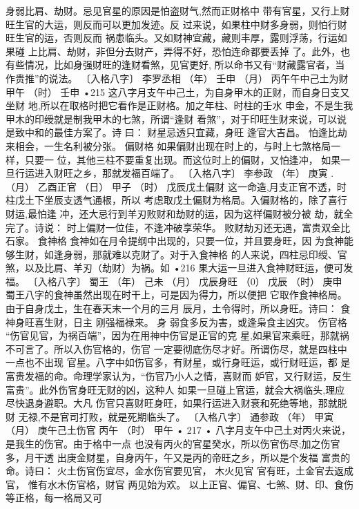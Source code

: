身弱比肩、劫财。忌见官星的原因是怕盗财气,然而正财格中
带有官星，又行上财旺生官的大运，则反而可以更加发迹。反
过来说，如果柱中财多身弱，则怕行财旺生官的运，否则反而
祸患临头。又如财神宜藏，藏则丰厚，露则浮荡，行运如果碰
上比肩、劫财，非但分去财产，弄得不好，恐怕连命都要丢掉
了。此外，也有些情况，比如身强财旺的逢财看煞，见官更好,
所以命书又有“财藏露官者，当作贵推”的说法。
〔入格八字〕 李罗丞相
（年） 壬申
（月） 丙午午中己土为财
甲午
（时） 壬申
•215
这八字月支午中己土，为自身甲木的正财，而自身日支又坐财
地,所以在取格时把它看作是正财格。加之年柱、时柱的壬水
申金，不是生我甲木的印绶就是制我甲木的七煞，所谓“逢财
看煞”，对于印旺生财来说，可以说是致中和的最佳方案了。诗
曰：
财星忌透只宜藏，身旺 逢官大吉昌。
怕逢比劫来相会，一生名利被分张。
偏财格
如果偏财出现在时上的，与时上七煞格局一样，只要一
位，其他三柱不要重复出现。而这位时上的偏财，又怕逢冲，
如果一旦行运进入财旺之乡，那就发福百端了。
〔入格八字〕 李参政
（年） 庚寅 .
（月） 乙酉正官
（日） 甲子
（时） 戊辰戊土偏财
这一命造,月支正官不透，时柱戊土下坐辰支透气通根，所以
考虑取戊土偏财为格局。入偏财格的，除了喜行财运,最怕逢
冲，还大忌行到羊刃败财和劫财的运，因为这样偏财被分被
劫，就全完了。诗说：
时上偏财一位佳，不逢冲破享荣华。
败财劫刃还无遇，富贵双全比石家。
食神格
食神如在月令提纲中出现的，只要一位，并且要身旺，因
为食神能够生财，如逢身弱，那就难以克财了。对于入食神格
的人来说，四柱忌印绶、官煞，以及比肩、羊刃（劫财）为祸。如
•216
果大运一旦进入食神财旺运，便可发福。
〔入格八字〕 蜀王
（年） 己未
（月） 戊辰身旺
（0） 戊辰
（时） 庚申
蜀王八字的食神虽然出现在时干上，可是因为得力，所以便把
它取作食神格局。由于自身戊土，生在春天末一个月的三月
辰月，土令得时，所以身旺。诗曰：
食神身旺喜生财，日主 刚强福禄来。
身 弱食多反为害，或逢枭食主凶灾。
伤官格
“伤官见官，为祸百端”，因为在用神中伤官是正官的克
星,如果官来乘旺，那就祸不可言了。所以入伤官格的，伤官
一定要彻底伤尽才好。所谓伤尽，就是四柱中一点也不出现
官星。八字中如伤官多，有财星，或行身旺运，或行财旺运，都
是富贵发福的命。命理学家认为，“伤官乃小人之情，喜财而
妒官，又行财运，反生富贵”。此外伤官身旺无财的凶，这种人
如果一旦碰上官运，就会大祸临头,理应尽快退身避职。大凡
伤官只喜财旺身旺，如果行运进入财衰和死绝等地，那就脱财
无禄,不是官司打败，就是死期临头了。
〔入格八字〕 通参政
（年） 甲寅
（月） 庚午己土伤官
丙午
（时） 甲午
• 217 •
八字月支午中己土对丙火来说，是我生的伤官。由于格中一点
也没有丙火的官星癸水，所以伤官伤尽;加之伤官多，月干透
出庚金财星，自身丙午，午又是丙的帝旺之乡，所以是个发福
富贵的命。诗曰：
火土伤官伤宜尽，金水伤官要见官，
木火见官 官有旺，土金官去返成官，
惟有水木伤官格，财官 两见始为欢。
以上正官、偏官、七煞、财、印、食伤等正格，每一格局又可
